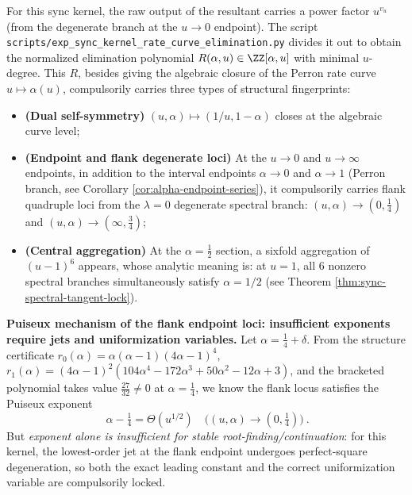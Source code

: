 \begin{remark}[Structure of the elimination curve: dual symmetry, endpoint singular loci, and \texorpdfstring{$\alpha=\tfrac12$}{alpha=1/2} aggregation fingerprint]\label{rem:rate-algebraic-elimination-structure}
For this sync kernel, the raw output of the resultant carries a power factor \(u^{v_u}\) (from the degenerate branch at the \(u\to 0\) endpoint).
The script \texttt{scripts/exp\_sync\_kernel\_rate\_curve\_elimination.py} divides it out to obtain the normalized elimination polynomial \(R(\alpha,u)\in\ZZ[\alpha,u]\) with minimal \(u\)-degree.
This \(R\), besides giving the algebraic closure of the Perron rate curve \(u\mapsto \alpha(u)\), compulsorily carries three types of structural fingerprints:
\begin{itemize}
  \item \textbf{(Dual self-symmetry)} \((u,\alpha)\mapsto(1/u,1-\alpha)\) closes at the algebraic curve level;
  \item \textbf{(Endpoint and flank degenerate loci)} At the \(u\to 0\) and \(u\to\infty\) endpoints, in addition to the interval endpoints \(\alpha\to0\) and \(\alpha\to1\) (Perron branch, see Corollary \ref{cor:alpha-endpoint-series}), it compulsorily carries flank quadruple loci from the \(\lambda=0\) degenerate spectral branch: \((u,\alpha)\to(0,\tfrac14)\) and \((u,\alpha)\to(\infty,\tfrac34)\);
  \item \textbf{(Central aggregation)} At the \(\alpha=\tfrac12\) section, a sixfold aggregation of \((u-1)^6\) appears, whose analytic meaning is: at \(u=1\), all \(6\) nonzero spectral branches simultaneously satisfy \(\alpha=1/2\) (see Theorem \ref{thm:sync-spectral-tangent-lock}).
\end{itemize}
\par
\noindent\textbf{Puiseux mechanism of the flank endpoint loci: insufficient exponents require jets and uniformization variables.}
Let \(\alpha=\tfrac14+\delta\). From the structure certificate
\(
r_0(\alpha)=\alpha(\alpha-1)(4\alpha-1)^4
\),
\(
r_1(\alpha)=(4\alpha-1)^2(104\alpha^4-172\alpha^3+50\alpha^2-12\alpha+3)
\),
and the bracketed polynomial takes value \(\tfrac{27}{32}\neq0\) at \(\alpha=\tfrac14\), we know the flank locus satisfies the Puiseux exponent
\[
\boxed{\ \alpha-\tfrac14=\Theta(u^{1/2})\quad\bigl((u,\alpha)\to(0,\tfrac14)\bigr)\ }.
\]
But \emph{exponent alone is insufficient for stable root-finding/continuation}: for this kernel, the lowest-order jet at the flank endpoint undergoes perfect-square degeneration, so both the exact leading constant and the correct uniformization variable are compulsorily locked.

\end{remark}
